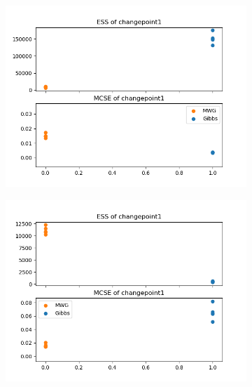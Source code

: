 \begin{figure}[H]
    \centering
    \begin{subfigure}{.3\textwidth}
    	\centering
        \includegraphics[width=\linewidth]{../../plots/ess_se_M2_N50_NMCMC1_seed0_diffind2.png}
    \end{subfigure}
    \begin{subfigure}{.3\textwidth}
        \centering
    	\includegraphics[width=\linewidth]{../../plots/ess_se_M2_N20000_NMCMC3_seed0_diffind2.png}
	\end{subfigure}
	\begin{subfigure}{.3\textwidth}
	    \centering

\end{subfigure}
\end{figure}
